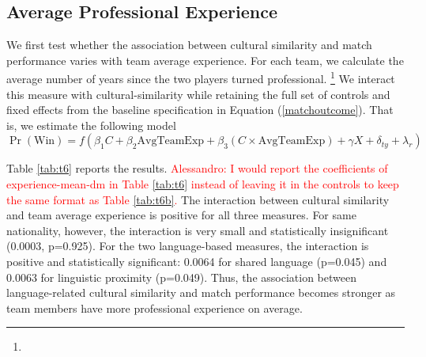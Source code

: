 \documentclass[10pt]{article}
\begin{document}
\subsection{Average Professional Experience} 










We first test whether the association between cultural similarity and match performance varies with team average experience. For each team, we calculate the average number of years since the two players turned professional. \footnote{} We interact this measure with cultural-similarity while retaining the full set of controls and fixed effects from the baseline specification in Equation (\ref{matchoutcome}). That is, we estimate the following model
\begin{equation}
\operatorname{Pr}(\text{Win}) = f(\beta_1 C + \beta_2 \text{AvgTeamExp} + \beta_3 (C \times \text{AvgTeamExp}) + \gamma X + \delta_{ty} + \lambda_r)
\end{equation}


Table \ref{tab:t6} reports the results. \textcolor{red}{Alessandro: I would report the coefficients of experience-mean-dm in Table \ref{tab:t6} instead of leaving it in the controls to keep the same format as Table \ref{tab:t6b}.} The interaction between cultural similarity and team average experience is positive for all three measures. For same nationality, however, the interaction is very small and statistically insignificant (0.0003, p=0.925). For the two language-based measures, the interaction is positive and statistically significant: 0.0064 for shared language (p=0.045) and 0.0063 for linguistic proximity (p=0.049). Thus, the association between language-related cultural similarity and match performance becomes stronger as team members have more professional experience on average.
\end{document}
